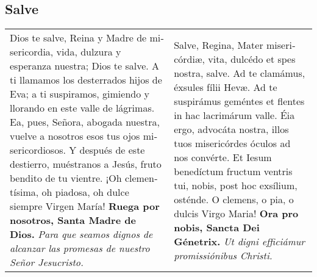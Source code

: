 \documentclass[./devocionario.tex]{subfiles}
\begin{document}
\subsection*{Salve}
\begin{tabular} { p{} p{} }
    Dios te salve, Reina y Madre de mi­se­ri­cordia, vida, dulzura y esperanza nuestra; Dios te salve. 
    A ti llamamos los desterrados hijos de Eva; a ti suspiramos, gimiendo y llorando en este valle de lágrimas. 
    Ea, pues, Señora, abogada nuestra, vuelve a nosotros esos tus ojos mi­se­ri­cordiosos. Y después de este destierro, muéstranos a Jesús, 
    fruto bendito de tu vientre. ¡Oh cle­men­tísima, oh piadosa, oh dulce siempre Virgen María!\newline
    \textbf{Ruega por nosotros, Santa Madre de Dios.}\newline
    \textit{Para que seamos dignos de alcanzar las promesas de nuestro Señor Jesucristo.}

    &
    
    Salve, Regina, Mater mi­se­ri­córdiæ, vita, dulcédo et spes nostra, salve. Ad te clamámus, éxsules fílii Hevæ. 
    Ad te suspirámus geméntes et flentes in hac lacrimárum valle. Éia ergo, advocáta nostra, illos tuos mi­se­ri­córdes óculos ad nos convérte. 
    Et Iesum benedíctum fructum ventris tui, nobis, post hoc exsílium, osténde. O clemens, o pia, o dulcis Virgo Maria!\newline
    \textbf{Ora pro nobis, Sancta Dei Génetrix.}\newline
    \textit{Ut digni efficiámur pro­mi­ssiónibus Christi.}
\end{tabular}
    
\end{document}

